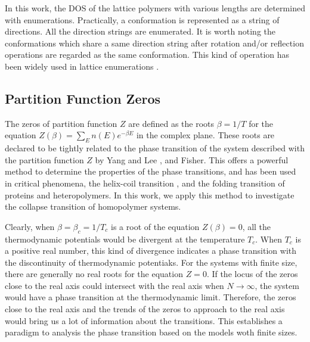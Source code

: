 \documentclass[preprint,preprintnumbers,amsmath,amssymb,showpacs,aps,pre]{revtex4-1}
\begin{document}
In this work, the DOS of the lattice polymers with various lengths are
determined with enumerations. Practically, a conformation is represented
as a string of directions. All the direction strings are enumerated. It is
worth noting the conformations which share a same direction string after
rotation and/or reflection operations are regarded as the same conformation.
This kind of operation has been widely used in lattice enumerations
\cite{CieplakPRL98,PandePRL96}.

\subsection{Partition Function Zeros}

The zeros of partition function $Z$ are defined as the roots $\beta=1/T$
for the equation $Z(\beta)=\sum_E n(E)e^{-\beta E}$ in the complex plane.
These roots are declared to be tightly related to the phase transition
of the system described with the partition function $Z$ by Yang and Lee
\cite{LYPR52}, and Fisher\cite{FisherBook}. This offers a powerful method
to determine the properties of the phase transitions, and has been used
in critical phenomena\cite{LipowskiIJMPB05}, the helix-coil transition
\cite{HansmannPRL00,HansmannPA01}, and the folding transition of
proteins and heteropolymers\cite{WangJCP03,ChenPA05}.
In this work, we apply this method to investigate
the collapse transition of homopolymer systems.

Clearly, when $\beta=\beta_c=1/T_c$ is a root of the equation $Z(\beta)=0$, all
the thermodynamic potentials would be divergent at the temperature $T_c$. When
$T_c$ is a positive real number, this kind of divergence indicates a phase
transition with the discontinuity of thermodynamic potentiaks. For the systems
with finite size, there are generally no real roots for the equation $Z=0$.
If the locus of the zeros close to the real axis could intersect with the
real axis when $N\rightarrow\infty$, the system would have a phase transition
at the thermodynamic limit. Therefore, the zeros close to the real axis and
the trends of the zeros to approach to the real axis would bring us a lot of
information about the transitions. This establishes a paradigm to analysis
the phase transition based on the models woth finite sizes.
\end{document}
